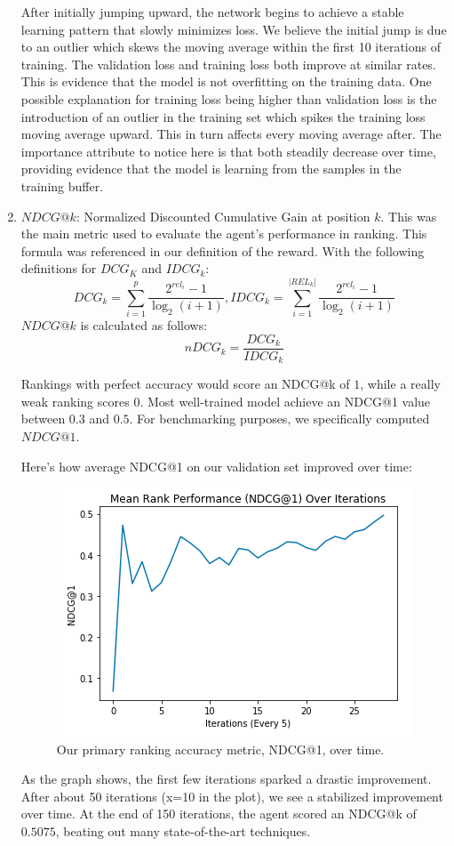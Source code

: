 \documentclass{article}
\begin{document}
\begin{enumerate}
    After initially jumping upward, the network begins to achieve a stable learning pattern that slowly minimizes loss. We believe the initial jump is due to an outlier which skews the moving average within the first 10 iterations of training. The validation loss and training loss both improve at similar rates. This is evidence that the model is not overfitting on the training data. One possible explanation for training loss being higher than validation loss is the introduction of an outlier in the training set which spikes the training loss moving average upward. This in turn affects every moving average after. The importance attribute to notice here is that both steadily decrease over time, providing evidence that the model is learning from the samples in the training buffer.
    
    \item $NDCG @ k$: Normalized Discounted Cumulative Gain at position $k$. This was the main metric used to evaluate the agent's performance in ranking. This formula was referenced in our definition of the reward. With the following definitions for $DCG_K$ and $IDCG_k$:
    $$DCG_k = \sum_{i=1}^{p} \frac{2^{rel_i}-1}{\log_2(i+1)}, IDCG_k = \sum_{i=1}^{|REL_k|} \frac{2^{rel_i}-1}{\log_2(i+1)}$$
    $NDCG @ k$ is calculated as follows:
    $$nDCG_k = \frac{DCG_k}{IDCG_k}$$
    
    Rankings with perfect accuracy would score an NDCG@k of $1$, while a really weak ranking scores $0$. 
     Most well-trained model achieve an NDCG@1 value between $0.3$ and $0.5$.
     For benchmarking purposes, we specifically computed $NDCG @ 1$.
    
    Here's how average NDCG@1 on our validation set improved over time:
    
    \begin{figure}[h]
        \centering
        \includegraphics[scale=0.7]{mdcg.png}
        \caption{Our primary ranking accuracy metric, NDCG@1, over time.}
        \label{fig:my_label}
    \end{figure}
    
    As the graph shows, the first few iterations sparked a drastic improvement. After about 50 iterations (x=10 in the plot), we see a stabilized improvement over time. At the end of 150 iterations, the agent scored an NDCG@k of $0.5075$, beating out many state-of-the-art techniques.
\end{enumerate}
\end{document}
